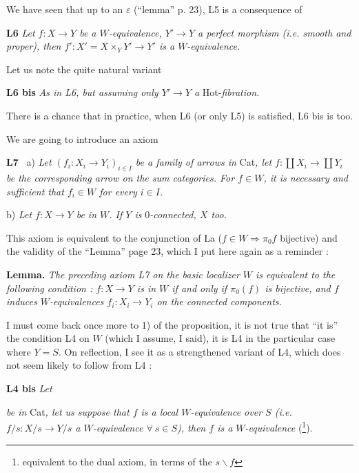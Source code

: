 \documentclass[11pt]{article}
\newcommand{\printedpage}[1]{\marginpar{\footnotesize p.~#1}}
\newcommand{\msp}[1]{\marginpar{\footnotesize [#1]}}
\begin{document}
We have seen that up to an $\varepsilon$ (``lemma'' p. 23), L5 is a consequence of

\textbf{L6} \textit{Let $f : X \longrightarrow Y$ be a $W$-equivalence, $Y' \longrightarrow Y$ a perfect morphism (i.e. smooth and proper), then $f' : X' = X \times_Y Y' \longrightarrow Y'$ is a $W$-equivalence.}

\msp{page 44}
Let us note the quite natural variant

\textbf{L6 bis} \textit{As in L6, but assuming only $Y' \longrightarrow Y$ a} Hot-\textit{fibration.}

\printedpage{28}

There is a chance that in practice, when L6 (or only L5) is satisfied, L6 bis is too. %

We are going to introduce an axiom

\textbf{L7} \ a) \textit{Let $(f_i : X_i \longrightarrow Y_i)_{i \in I}$ be a family of arrows in} Cat\textit{, let $f : \coprod X_i \longrightarrow \coprod Y_i$ be the corresponding arrow on the sum categories. For $f \in W$, it is necessary and sufficient that $f_i \in W$ for every $i \in I$.}

\hspace*{2em}b) \textit{Let $f : X \longrightarrow Y$ be in $W$. If $Y$ is} $0$\textit{-connected, $X$ too.}

This axiom is equivalent to the conjunction of La ($f \in W \Longrightarrow \pi_0 f$ bijective) and the validity of the ``Lemma'' page 23, which I put here again as a reminder :

\textbf{Lemma.} \textit{The preceding axiom L7 on the basic localizer $W$ is equivalent to the following condition : $f : X \longrightarrow Y$ is in $W$ if and only if $\pi_0(f)$ is bijective, and $f$ induces $W$-equivalences $f_i : X_i \longrightarrow Y_i$ on the connected components.}

I must come back once more to 1) of the proposition, it is not true that ``it is'' the condition L4 on $W$ (which I assume, I said), it is L4 in the particular case where $Y = S$. On reflection, I see it as a strengthened variant of L4, which does not seem likely to follow from L4 :

\textbf{L4 bis} \textit{Let}  \textit{be in} Cat\textit{, let us suppose that $f$ is a local $W$-equivalence over $S$ (i.e. $f/s : X/s \longrightarrow Y/s$ a $W$-equivalence $\forall\ s \in S$), then $f$ is a $W$-equivalence} (\footnote[29]{equivalent to the dual axiom, in terms of the $s\backslash f$}).
\end{document}

